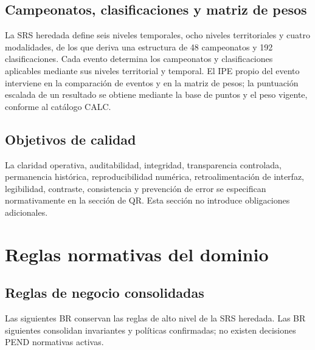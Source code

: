 \documentclass[10pt,letterpaper]{article}
\begin{document}
\subsection{Campeonatos, clasificaciones y matriz de pesos}
La SRS heredada define seis niveles temporales, ocho niveles territoriales y cuatro modalidades, de los que deriva una estructura de 48 campeonatos y 192 clasificaciones. Cada evento determina los campeonatos y clasificaciones aplicables mediante sus niveles territorial y temporal. El IPE propio del evento interviene en la comparación de eventos y en la matriz de pesos; la puntuación escalada de un resultado se obtiene mediante la base de puntos y el peso vigente, conforme al catálogo CALC.

\subsection{Objetivos de calidad}
La claridad operativa, auditabilidad, integridad, transparencia controlada, permanencia histórica, reproducibilidad numérica, retroalimentación de interfaz, legibilidad, contraste, consistencia y prevención de error se especifican normativamente en la sección de QR. Esta sección no introduce obligaciones adicionales.

\section{Reglas normativas del dominio}
\subsection{Reglas de negocio consolidadas}
Las siguientes BR conservan las reglas de alto nivel de la SRS heredada. Las BR siguientes consolidan invariantes y políticas confirmadas; no existen decisiones PEND normativas activas.
\end{document}
